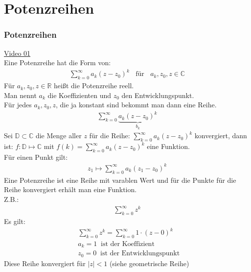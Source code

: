 \chapter{Potenzreihen}
\setcounter{section}{14}
\setcounter{subsection}{0}
\setcounter{subsubsection}{1}
\setcounter{secnumdepth}{4}
\subsection{Potenzreihen}
\href{https://youtu.be/f8ZfnOCjNYM}{Video 01}\\
Eine Potenzreihe hat die Form von:\\
\begin{align*}
	\sum\limits_{k=0}^{\infty}a_k(z-z_0)^k\;\;\text{ für }\;\;a_k, z_0, z\in \mathbb{C}
\end{align*}
Für $ a_k, z_0, z\in \mathbb{R} $ heißt die Potenzreihe reell.\\
Man nennt $ a_k $ die Koeffizienten und $ z_0 $ den Entwicklungspunkt.\\
Für jedes $ a_k, z_0, z $, die ja konstant sind bekommt man dann eine Reihe.\\
\begin{align*}
	\sum\limits_{k=0}^\infty{}\underbrace {a_k(z-z_0)^k}_{b_k}
\end{align*}
Sei $ \mathbb{D} \subset  \mathbb{C}$ die Menge aller $ z $ für die Reihe: $ \sum\limits_{k=0}^{\infty}a_k(z-z_0)^k $ konvergiert, dann ist: $f:\mathbb{D}\mapsto \mathbb{C}$ mit $ f(k)=\sum\limits_{k=0}^{\infty}a_k(z-z_0) ^k$ eine Funktion.\\
Für einen Punkt gilt:\\
\begin{align*}
	z_1\mapsto\sum\limits_{k=0}^{\infty}a_k(z_1-z_0)^k
\end{align*}
Eine Potenzreihe ist eine Reihe mit varablen Wert und für die Punkte für die Reihe konvergiert erhält man eine Funktion.\\
Z.B.:\\
\begin{align*}
	\sum\limits_{k=0}^{\infty}z^k
\end{align*}
Es gilt:\\
\begin{align*}
	&\sum\limits_{k=0}^{\infty}z^k=\sum\limits_{k=0}^{\infty}1\cdot(z-0)^k\\
	&a_k=1\;\;\text{ist der Koeffizient }\\
	&z_0=0\;\;\text{ist der Entwicklungspunkt }
\end{align*}
Diese Reihe konvergiert für $ |z|<1 $ (siehe geometrische Reihe)\\
